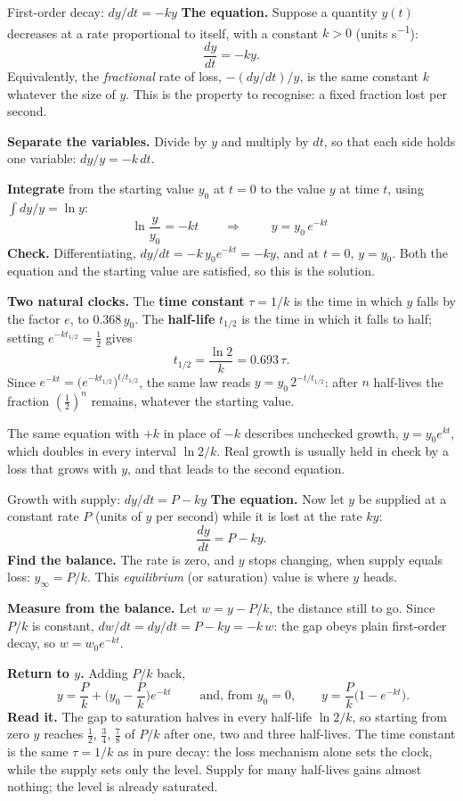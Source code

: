 \begin{derivbox}{First-order decay: $dy/dt=-ky$}
\textbf{The equation.} Suppose a quantity $y(t)$ decreases at a rate proportional to itself, with a
constant $k>0$ (units \si{s^{-1}}):
\[
\frac{dy}{dt}=-ky .
\]
Equivalently, the \emph{fractional} rate of loss, $-(dy/dt)/y$, is the same constant $k$ whatever the
size of $y$. This is the property to recognise: a fixed fraction lost per second.

 \textbf{Separate the variables.} Divide by $y$ and multiply by $dt$, so that each side holds
one variable: $dy/y=-k\,dt$.

 \textbf{Integrate} from the starting value $y_0$ at $t=0$ to the value $y$ at time $t$, using
$\int dy/y=\ln y$:
\[
\ln\frac{y}{y_0}=-kt\qquad\Longrightarrow\qquad \boxed{\;y=y_0\,e^{-kt}\;}
\]
 \textbf{Check.} Differentiating, $dy/dt=-k\,y_0e^{-kt}=-ky$, and at $t=0$, $y=y_0$. Both the
equation and the starting value are satisfied, so this is the solution.

 \textbf{Two natural clocks.} The \textbf{time constant} $\tau=1/k$ is the time in which $y$
falls by the factor $e$, to $0.368\,y_0$. The \textbf{half-life} $t_{1/2}$ is the time in which it falls
to half; setting $e^{-kt_{1/2}}=\tfrac12$ gives
\[
t_{1/2}=\frac{\ln2}{k}=0.693\,\tau .
\]
Since $e^{-kt}=\big(e^{-kt_{1/2}}\big)^{t/t_{1/2}}$, the same law reads $y=y_0\,2^{-t/t_{1/2}}$: after $n$
half-lives the fraction $(\tfrac12)^{n}$ remains, whatever the starting value.
\end{derivbox}

The same equation with $+k$ in place of $-k$ describes unchecked growth, $y=y_0e^{kt}$, which doubles in
every interval $\ln2/k$. Real growth is usually held in check by a loss that grows with $y$, and that
leads to the second equation.

\begin{derivbox}{Growth with supply: $dy/dt=P-ky$}
\textbf{The equation.} Now let $y$ be supplied at a constant rate $P$ (units of $y$ per second) while it is
lost at the rate $ky$:
\[
\frac{dy}{dt}=P-ky .
\]
 \textbf{Find the balance.} The rate is zero, and $y$ stops changing, when supply equals loss:
$y_\infty=P/k$. This \emph{equilibrium} (or saturation) value is where $y$ heads.

 \textbf{Measure from the balance.} Let $w=y-P/k$, the distance still to go. Since $P/k$ is
constant, $dw/dt=dy/dt=P-ky=-k\,w$: the gap obeys plain first-order decay, so $w=w_0e^{-kt}$.

 \textbf{Return to $y$.} Adding $P/k$ back,
\[
\boxed{\;y=\frac{P}{k}+\Big(y_0-\frac{P}{k}\Big)e^{-kt}\;}
\qquad\text{and, from }y_0=0,\qquad y=\frac{P}{k}\big(1-e^{-kt}\big).
\]
 \textbf{Read it.} The gap to saturation halves in every half-life $\ln2/k$, so starting from
zero $y$ reaches $\tfrac12$, $\tfrac34$, $\tfrac78$ of $P/k$ after one, two and three half-lives. The time
constant is the same $\tau=1/k$ as in pure decay: the loss mechanism alone sets the clock, while the
supply sets only the level. Supply for many half-lives gains almost nothing; the level is already
saturated.
\end{derivbox}

